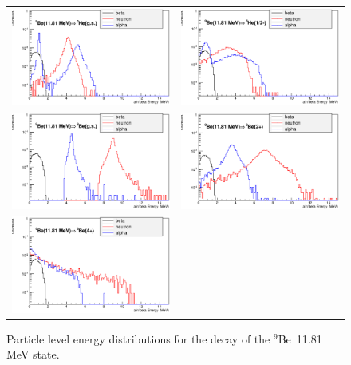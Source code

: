 \documentclass{JINST}
\newcommand{\beNINE}{$^{9}$Be~}
\begin{document}
   \begin{figure}[htp]
     \centering
   
  \begin{tabular}{cc}
    \includegraphics[width=70mm]{a_n_beta_spect_c14.eps}&

    \includegraphics[width=70mm]{a_n_beta_spect_c15.eps}\\
    \includegraphics[width=70mm]{a_n_beta_spect_c16.eps}&

    \includegraphics[width=70mm]{a_n_beta_spect_c17.eps}\\
    
    \includegraphics[width=70mm]{a_n_beta_spect_c18.eps}&
   
    \end{tabular}
     \caption{Particle level energy distributions for the decay of the \beNINE 11.81 MeV state.}
    \end{figure}
       
\end{document}
